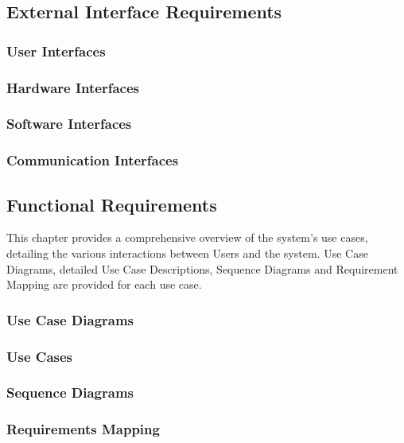 \subsection{External Interface Requirements}
\subsubsection{User Interfaces}
\subsubsection{Hardware Interfaces}
\subsubsection{Software Interfaces}
\subsubsection{Communication Interfaces}
\subsection{Functional Requirements}
This chapter provides a comprehensive overview of the system's use cases, detailing the various interactions between Users and the system.
Use Case Diagrams, detailed Use Case Descriptions, Sequence Diagrams and Requirement Mapping are provided for each use case.
\subsubsection{Use Case Diagrams}
\subsubsection{Use Cases}
\subsubsection{Sequence Diagrams}
\subsubsection{Requirements Mapping}

